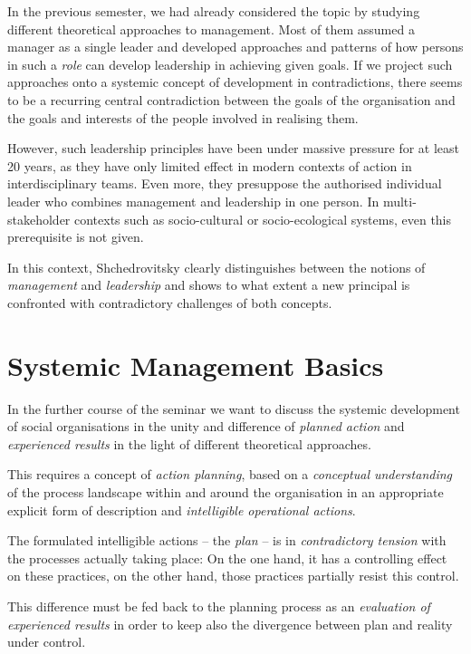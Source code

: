 \documentclass[11pt,a4paper]{article}
\begin{document}
In the previous semester, we had already considered the topic by studying
different theoretical approaches to management.  Most of them assumed a
manager as a single leader and developed approaches and patterns of how
persons in such a \emph{role} can develop leadership in achieving given goals.
If we project such approaches onto a systemic concept of development in
contradictions, there seems to be a recurring central contradiction between
the goals of the organisation and the goals and interests of the people
involved in realising them.

However, such leadership principles have been under massive pressure for at
least 20 years, as they have only limited effect in modern contexts of action
in interdisciplinary teams. Even more, they presuppose the authorised
individual leader who combines management and leadership in one person. In
multi-stakeholder contexts such as socio-cultural or socio-ecological systems,
even this prerequisite is not given.

In this context, Shchedrovitsky clearly distinguishes between the notions of
\emph{management} and \emph{leadership} \cite[p. 27-30]{MSM} and shows to what
extent a new principal is confronted with contradictory challenges of both
concepts.

\section{Systemic Management Basics}

In the further course of the seminar we want to discuss the systemic
development of social organisations in the unity and difference of
\emph{planned action} and \emph{experienced results} in the light of different
theoretical approaches.

This requires a concept of \emph{action planning}, based on a \emph{conceptual
  understanding} of the process landscape within and around the organisation
in an appropriate explicit form of description and \emph{intelligible
  operational actions}.

The formulated intelligible actions -- the \emph{plan} -- is in
\emph{contradictory tension} with the processes actually taking place: On the
one hand, it has a controlling effect on these practices, on the other hand,
those practices partially resist this control.

This difference must be fed back to the planning process as an
\emph{evaluation of experienced results} in order to keep also the divergence
between plan and reality under control.
\end{document}
